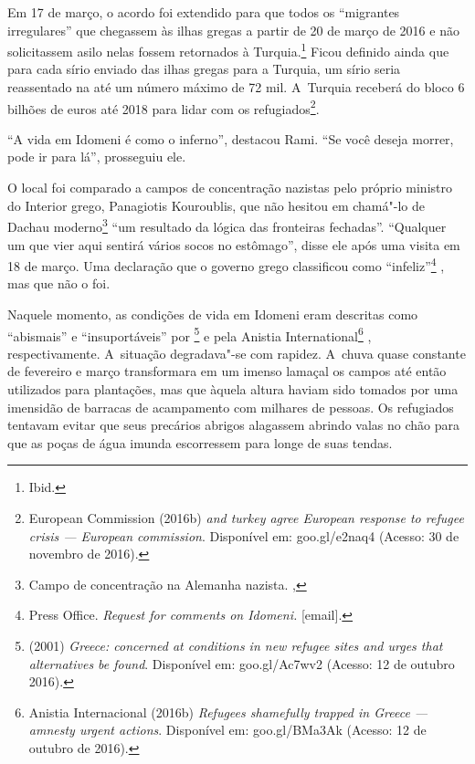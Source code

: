Em 17 de março, o acordo foi extendido para que todos os ``migrantes
irregulares'' que chegassem às ilhas gregas a partir de 20 de março de
2016 e não solicitassem asilo nelas fossem retornados à
Turquia.\footnote{ Ibid.}  Ficou definido ainda que para cada sírio
enviado das ilhas gregas para a Turquia, um sírio seria reassentado na
 até um número máximo de 72 mil. A~Turquia receberá do bloco 6 bilhões
de euros até 2018 para lidar com os refugiados\footnote{ European Commission (2016b) \emph{ and turkey agree
European response to refugee crisis --- European commission}. Disponível
em: goo.gl/e2naq4
(Acesso: 30 de
novembro de 2016).}.

``A vida em Idomeni é como o inferno'', destacou Rami. ``Se você deseja
morrer, pode ir para lá'', prosseguiu ele.

O local foi comparado a campos de concentração nazistas pelo próprio
ministro do Interior grego, Panagiotis Kouroublis, que não hesitou em
chamá"-lo de Dachau moderno\footnote{ Campo de concentração na Alemanha nazista. 
,}
 ``um resultado da
lógica das fronteiras fechadas''. ``Qualquer um que vier aqui sentirá
vários socos no estômago'', disse ele após uma visita em 18 de março.
Uma declaração que o governo grego classificou como
``infeliz''\footnote{ Press Office. \emph{Request for comments on
Idomeni}\emph{.} {[}email{]}.} , mas que não o foi.

Naquele momento, as condições de vida em Idomeni eram descritas como
``abismais'' e ``insuportáveis'' por \footnote{  (2001) \emph{Greece:  concerned at
conditions in new refugee sites and urges that alternatives be found}.
Disponível em:
goo.gl/Ac7wv2
(Acesso: 12 de outubro 2016).}  e
pela  Anistia International\footnote{ Anistia Internacional (2016b) \emph{Refugees
shamefully trapped in Greece --- amnesty urgent actions}. Disponível em:
goo.gl/BMa3Ak
(Acesso: 12 de outubro de 2016).} ,
respectivamente. A~situação degradava"-se com rapidez. A~chuva quase
constante de fevereiro e março transformara em um imenso lamaçal os
campos até então utilizados para plantações, mas que àquela altura
haviam sido tomados por uma imensidão de barracas de acampamento com
milhares de pessoas. Os refugiados tentavam evitar que seus precários
abrigos alagassem abrindo valas no chão para que as poças de água imunda
escorressem para longe de suas tendas.

